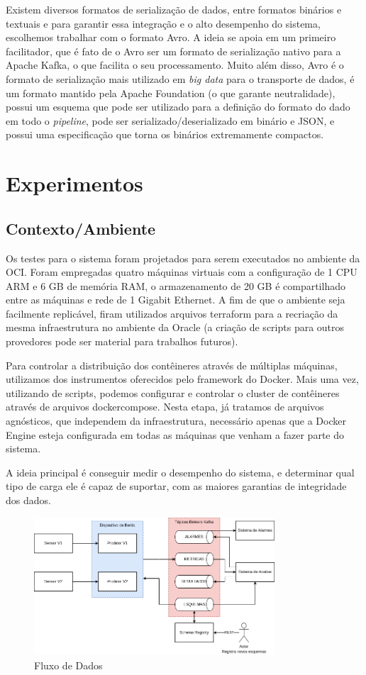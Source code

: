 \documentclass[12pt]{article}
\begin{document}
Existem diversos formatos de serialização de dados, entre formatos binários e textuais e para garantir essa integração e o alto desempenho do sistema, escolhemos trabalhar com o formato Avro. A ideia se apoia em um primeiro facilitador, que é fato de o Avro ser um formato de serialização nativo para a Apache Kafka, o que facilita o seu processamento. Muito além disso, Avro é o formato de serialização mais utilizado em \textit{big data} para o transporte de dados, é um formato mantido pela Apache Foundation (o que garante neutralidade), possui um esquema que pode ser utilizado para a definição do formato do dado em todo o \textit{pipeline}, pode ser serializado/deserializado em binário e JSON, e possui uma especificação que torna os binários extremamente compactos.

\section{Experimentos}

\subsection{Contexto/Ambiente}
Os testes para o sistema foram projetados para serem executados no ambiente da OCI. Foram empregadas quatro máquinas virtuais com a configuração de 1 CPU ARM e 6 GB de memória RAM, o armazenamento de 20 GB é compartilhado entre as máquinas e rede de 1 Gigabit Ethernet. A fim de que o ambiente seja facilmente replicável, firam utilizados arquivos terraform para a recriação da mesma infraestrutura no ambiente da Oracle (a criação de scripts para outros provedores pode ser material para trabalhos futuros).

Para controlar a distribuição dos contêineres através de múltiplas máquinas, utilizamos dos instrumentos oferecidos pelo framework do Docker. Mais uma vez, utilizando de scripts, podemos configurar e controlar o cluster de contêineres através de arquivos dockercompose. Nesta etapa, já tratamos de arquivos agnósticos, que independem da infraestrutura, necessário apenas que a Docker Engine esteja configurada em todas as máquinas que venham a fazer parte do sistema.

A ideia principal é conseguir medir o desempenho do sistema, e determinar qual tipo de carga ele é capaz de suportar, com as maiores garantias de integridade dos dados.

\begin{figure}[ht]
    \centering
    \includegraphics[width=0.8\textwidth]{images/fluxo_de_dados.png}
    \caption{Fluxo de Dados}
    \label{fig:fluxoDeDados}
\end{figure}
\end{document}
